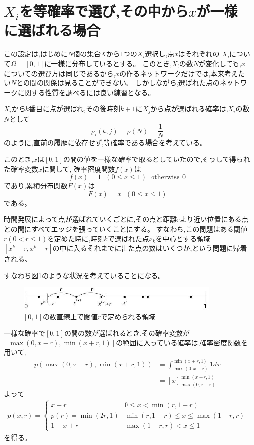 \section{$X_{i}$を等確率で選び,その中から$x$が一様に選ばれる場合}

この設定は,はじめに$N$個の集合$X$から1つの$X_{i}$選択し,点$x$はそれぞれの $X_{i}$について$\Omega = [0,1]$に一様に分布しているとする。
このとき,$X_{i}$の数$N$が変化しても,$x$についての選び方は同じであるから,$x$の作るネットワークだけでは,本来考えたい$N$との間の関係は見ることができない。
しかしながら,選ばれた点のネットワークに関する性質を調べるには良い練習となる。

$X_{i}$から$k$番目に点が選ばれ,その後時刻$k+1$に$X_{j}$から点が選ばれる確率は,$X_{i}$の数$N$として
\[p_{i}(k,j) = p(N) = \frac{1}{N}\]
のように,直前の履歴に依存せず,等確率である場合を考えている。

このとき,$x$は$[0,1]$の間の値を一様な確率で取るとしていたので,そうして得られた確率変数$x$に関して,
確率密度関数$f(x)$は
\[f(x) = 1\ \ \ (0\le x \le 1)\ \ \ \text{otherwise}\ \ 0\]
であり,累積分布関数$F(x)$は
\[F(x) = x\ \ \ (0\le x \le 1)\]
である。

時間発展によって点が選ばれていくごとに,その点と距離$r$より近い位置にある点との間にすべてエッジを張っていくことにする。
すなわち,この問題はある閾値$r(0<r\le1)$を定めた時に,時刻$k$で選ばれた点$x_{k}$を中心とする領域$[x^{k}-r, x^{k}+r]$の中に入るそれまでに出た点の数はいくつか,という問題に帰着される。

すなわち図\ref{fig:f2}のような状況を考えていることになる。
\begin{figure}[H]
    \begin{center}
        \includegraphics[width=10cm]{../simple1/simple001_1.jpg}
        \caption{$[0,1]$の数直線上で閾値$r$で定められる領域}
        \label{fig:f2}
    \end{center}
\end{figure}
一様な確率で$[0,1]$の間の数が選ばれるとき,その確率変数が$[\max(0,x-r), \min(x+r,1)]$の範囲に入っている確率は,確率密度関数を用いて,
\begin{align}
p(\max(0, x-r), \min(x+r, 1)) &= \int ^{\min(x+r,1)}_{\max(0, x-r)} 1 dx \nonumber \\
&= \left[ x\right]^{\min(x+r,1)}_{\max(0, x-r)}
\end{align}
よって
\begin{eqnarray}
p(x,r)= \left\{ \begin{array}{ll}x+r & 0\le x< \min(r,1-r) \nonumber \\
p(r) = \min(2r, 1) & \min(r, 1-r)\le x \le \max(1-r, r) \nonumber \\
1 - x+r & \max(1-r, r) < x \le 1
\end{array}\right.
\end{eqnarray}
を得る。

